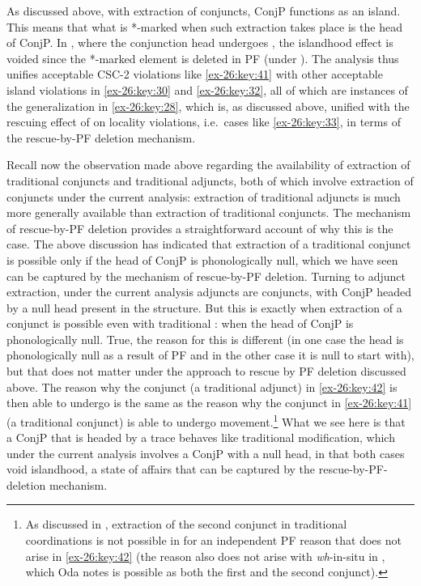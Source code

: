 \documentclass[output=paper]{langsci/langscibook}
\begin{document}
As discussed above, with extraction of conjuncts, ConjP functions as an island.
This means that what is *-marked when such extraction takes place is the head
of ConjP. In , where the conjunction head undergoes , the
islandhood effect is voided since the *-marked element is deleted in \gls{PF} (under
). The analysis thus unifies acceptable CSC-2 violations like \eqref{ex-26:key:41}
with other acceptable island violations in \eqref{ex-26:key:30} and \eqref{ex-26:key:32}, all of which are
instances of the generalization in \eqref{ex-26:key:28}, which is, as discussed above, unified
with the rescuing effect of  on locality violations, i.e.\ cases like
\eqref{ex-26:key:33}, in terms of the rescue-by-\gls{PF} deletion mechanism.

Recall now the observation made above regarding the availability of extraction
of traditional conjuncts and traditional adjuncts, both of which involve
extraction of conjuncts under the current analysis: extraction of traditional
adjuncts is much more generally available than extraction of traditional
conjuncts. The mechanism of rescue-by-\gls{PF} deletion provides a straightforward
account of why this is the case. The above discussion has indicated that
extraction of a traditional conjunct is possible only if the head of ConjP is
phonologically null, which we have seen can be captured by the mechanism of
rescue-by-PF deletion. Turning to adjunct extraction, under the current
analysis adjuncts are conjuncts, with ConjP headed by a null head present in
the structure. But this is exactly when extraction of a conjunct is possible
even with traditional : when the head of ConjP is phonologically
null. True, the reason for this is different (in one case the head is
phonologically null as a result of \gls{PF}  and in the other case it is
null to start with), but that does not matter under the approach to rescue by
\gls{PF} deletion discussed above. The reason why the conjunct (a traditional
adjunct) in \eqref{ex-26:key:42} is then able to undergo  is the same as the reason why
the conjunct in \eqref{ex-26:key:41} (a traditional conjunct) is able to undergo
movement.\footnote{As discussed in \textcite{Odainpress}, extraction of the
    second conjunct in traditional coordinations is not possible in 
for an independent \gls{PF} reason that does not arise in \eqref{ex-26:key:42} (the reason also does
not arise with \emph{wh}-in-situ in , which Oda notes is possible as
both the first and the second conjunct).} What we see here is that
a ConjP that is headed by a trace behaves like traditional 
modification, which under the current analysis involves a ConjP with a null
head, in that both cases void islandhood, a state of affairs that can be
captured by the rescue-by-PF-deletion mechanism.
\end{document}
